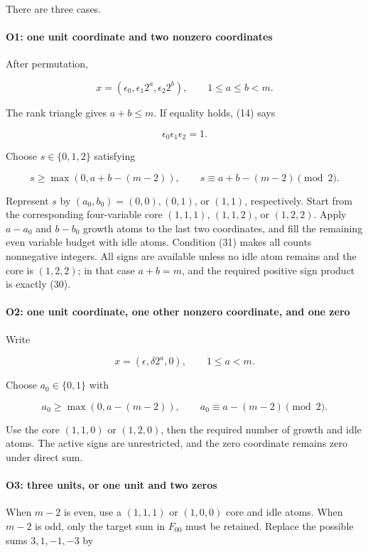 \documentclass[11pt]{article}
\theoremstyle{remark}
\begin{document}
There are three cases.

\paragraph{O1: one unit coordinate and two nonzero coordinates}

After permutation,

\[
x=(\epsilon_0,\epsilon_1 2^a,\epsilon_2 2^b),
\qquad 1\le a\le b<m.
\tag{29}
\]

The rank triangle gives $a+b\le m$. If equality holds, (14) says

\[
\epsilon_0\epsilon_1\epsilon_2=1.
\tag{30}
\]

Choose $s \in \{0,1,2\}$ satisfying

\[
s\ge\max(0,a+b-(m-2)),
\qquad
s\equiv a+b-(m-2)\pmod2.
\tag{31}
\]

Represent $s$ by $(a_0,b_0)=(0,0),(0,1)$, or $(1,1)$, respectively. Start from the corresponding four-variable core $(1,1,1)$, $(1,1,2)$, or $(1,2,2)$. Apply $a-a_0$ and $b-b_0$ growth atoms to the last two coordinates, and fill the remaining even variable budget with idle atoms. Condition (31) makes all counts nonnegative integers. All signs are available unless no idle atom remains and the core is $(1,2,2)$; in that case $a+b=m$, and the required positive sign product is exactly (30).

\paragraph{O2: one unit coordinate, one other nonzero coordinate, and one zero}

Write

\[
x=(\epsilon,\delta2^a,0),
\qquad1\le a<m.
\tag{32}
\]

Choose $a_0 \in \{0,1\}$ with

\[
a_0\ge\max(0,a-(m-2)),
\qquad
a_0\equiv a-(m-2)\pmod2.
\]

Use the core $(1,1,0)$ or $(1,2,0)$, then the required number of growth and idle atoms. The active signs are unrestricted, and the zero coordinate remains zero under direct sum.

\paragraph{O3: three units, or one unit and two zeros}

When $m-2$ is even, use a $(1,1,1)$ or $(1,0,0)$ core and idle atoms. When $m-2$ is odd, only the target sum in $F_{00}$ must be retained. Replace the possible sums $3,1,-1,-3$ by
\end{document}
